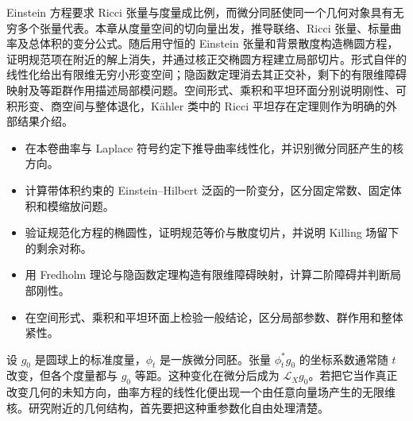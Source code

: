 
% 
% 


\begin{chapterabstract}
	Einstein 方程要求 Ricci 张量与度量成比例，而微分同胚使同一个几何对象具有无穷多个张量代表。本章从度量空间的切向量出发，推导联络、Ricci 张量、标量曲率及总体积的变分公式。随后用守恒的 Einstein 张量和背景散度构造椭圆方程，证明规范项在附近的解上消失，并通过核正交椭圆方程建立局部切片。形式自伴的线性化给出有限维无穷小形变空间；隐函数定理消去其正交补，剩下的有限维障碍映射及等距群作用描述局部模问题。空间形式、乘积和平坦环面分别说明刚性、可积形变、商空间与整体退化，Kähler 类中的 Ricci 平坦存在定理则作为明确的外部结果介绍。
\end{chapterabstract}

\begin{learninggoals}
	\begin{itemize}
		\item 在本卷曲率与 Laplace 符号约定下推导曲率线性化，并识别微分同胚产生的核方向。
		\item 计算带体积约束的 Einstein--Hilbert 泛函的一阶变分，区分固定常数、固定体积和模缩放问题。
		\item 验证规范化方程的椭圆性，证明规范等价与散度切片，并说明 Killing 场留下的剩余对称。
		\item 用 Fredholm 理论与隐函数定理构造有限维障碍映射，计算二阶障碍并判断局部刚性。
		\item 在空间形式、乘积和平坦环面上检验一般结论，区分局部参数、群作用和整体紧性。
	\end{itemize}
\end{learninggoals}

设 \(g_0\) 是圆球上的标准度量，\(\phi_t\) 是一族微分同胚。张量 \(\phi_t^*g_0\) 的坐标系数通常随 \(t\) 改变，但各个度量都与 \(g_0\) 等距。这种变化在微分后成为 \(\mathcal L_Xg_0\)。若把它当作真正改变几何的未知方向，曲率方程的线性化便出现一个由任意向量场产生的无限维核。研究附近的几何结构，首先要把这种重参数化自由处理清楚。


